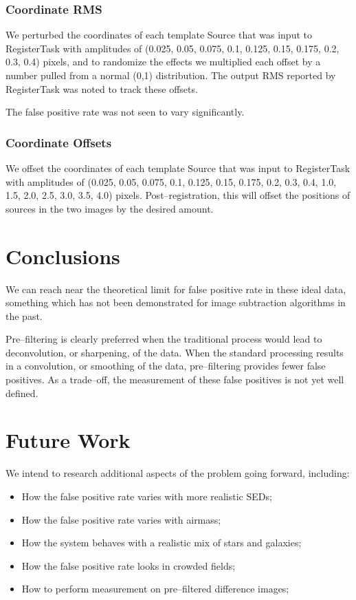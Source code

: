 \documentclass[prd, nofootinbib, floatfix, 11pt,tightenlines,times]{article}
\begin{document}
\subsubsection{Coordinate RMS}

We perturbed the coordinates of each template Source that was input to
RegisterTask with amplitudes of (0.025, 0.05, 0.075, 0.1, 0.125, 0.15,
0.175, 0.2, 0.3, 0.4) pixels, and to randomize the effects we
multiplied each offset by a number pulled from a normal (0,1)
distribution.  The output RMS reported by RegisterTask was noted to
track these offsets.

The false positive rate was not seen to vary significantly.

\subsubsection{Coordinate Offsets}

We offset the coordinates of each template Source that was input to
RegisterTask with amplitudes of (0.025, 0.05, 0.075, 0.1, 0.125, 0.15,
0.175, 0.2, 0.3, 0.4, 1.0, 1.5, 2.0, 2.5, 3.0, 3.5, 4.0) pixels.
Post--registration, this will offset the positions of sources in the
two images by the desired amount.

\section{Conclusions}

We can reach near the theoretical limit for false positive rate in
these ideal data, something which has not been demonstrated for image
subtraction algorithms in the past.

Pre--filtering is clearly preferred when the traditional process would
lead to deconvolution, or sharpening, of the data.  When the standard
processing results in a convolution, or smoothing of the data,
pre--filtering provides fewer false positives.  As a trade--off, the
measurement of these false positives is not yet well defined.

\section{Future Work}

We intend to research additional aspects of the problem going forward,
including:
\begin{itemize}
\item How the false positive rate varies with more realistic SEDs;
\item How the false positive rate varies with airmass;
\item How the system behaves with a realistic mix of stars and galaxies;
\item How the false positive rate looks in crowded fields;
\item How to perform measurement on pre--filtered difference images;
\end{itemize}
\end{document}
